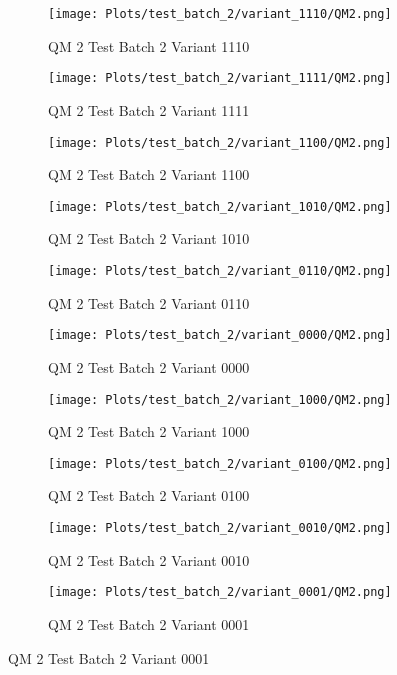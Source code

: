 \documentclass{DissertateFigs}
\begin{document}
\begin{figure}[t!]
    \begin{subfigure}{0.47\textwidth}
    \texttt{[image: Plots/test\_batch\_2/variant\_1110/QM2.png]}
    \caption{QM 2 Test Batch 2 Variant 1110}
    \end{subfigure}
    \begin{subfigure}{0.47\textwidth}
    \texttt{[image: Plots/test\_batch\_2/variant\_1111/QM2.png]}
    \caption{QM 2 Test Batch 2 Variant 1111}
    \end{subfigure}

\medskip

    \begin{subfigure}{0.47\textwidth}
    \texttt{[image: Plots/test\_batch\_2/variant\_1100/QM2.png]}
    \caption{QM 2 Test Batch 2 Variant 1100}
    \end{subfigure}
    \begin{subfigure}{0.47\textwidth}
    \texttt{[image: Plots/test\_batch\_2/variant\_1010/QM2.png]}
    \caption{QM 2 Test Batch 2 Variant 1010}
    \end{subfigure}

\medskip

    \begin{subfigure}{0.47\textwidth}
    \texttt{[image: Plots/test\_batch\_2/variant\_0110/QM2.png]}
    \caption{QM 2 Test Batch 2 Variant 0110}
    \end{subfigure}
    \begin{subfigure}{0.47\textwidth}
    \texttt{[image: Plots/test\_batch\_2/variant\_0000/QM2.png]}
    \caption{QM 2 Test Batch 2 Variant 0000}
    \end{subfigure}

\medskip

    \begin{subfigure}{0.47\textwidth}
    \texttt{[image: Plots/test\_batch\_2/variant\_1000/QM2.png]}
    \caption{QM 2 Test Batch 2 Variant 1000}
    \end{subfigure}
    \begin{subfigure}{0.47\textwidth}
    \texttt{[image: Plots/test\_batch\_2/variant\_0100/QM2.png]}
    \caption{QM 2 Test Batch 2 Variant 0100}
    \end{subfigure}

\medskip

    \begin{subfigure}{0.47\textwidth}
    \texttt{[image: Plots/test\_batch\_2/variant\_0010/QM2.png]}
    \caption{QM 2 Test Batch 2 Variant 0010}
    \end{subfigure}
    \begin{subfigure}{0.47\textwidth}
    \texttt{[image: Plots/test\_batch\_2/variant\_0001/QM2.png]}
    \caption{QM 2 Test Batch 2 Variant 0001}
    \end{subfigure}


\end{figure}
\end{document}
